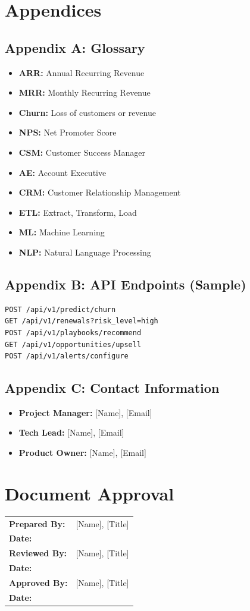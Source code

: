 \documentclass[12pt,a4paper]{article}
\begin{document}
\section{Appendices}

\subsection{Appendix A: Glossary}
\begin{itemize}
    \item \textbf{ARR:} Annual Recurring Revenue
    \item \textbf{MRR:} Monthly Recurring Revenue
    \item \textbf{Churn:} Loss of customers or revenue
    \item \textbf{NPS:} Net Promoter Score
    \item \textbf{CSM:} Customer Success Manager
    \item \textbf{AE:} Account Executive
    \item \textbf{CRM:} Customer Relationship Management
    \item \textbf{ETL:} Extract, Transform, Load
    \item \textbf{ML:} Machine Learning
    \item \textbf{NLP:} Natural Language Processing
\end{itemize}

\subsection{Appendix B: API Endpoints (Sample)}
\begin{verbatim}
POST /api/v1/predict/churn
GET /api/v1/renewals?risk_level=high
POST /api/v1/playbooks/recommend
GET /api/v1/opportunities/upsell
POST /api/v1/alerts/configure
\end{verbatim}

\subsection{Appendix C: Contact Information}
\begin{itemize}
    \item \textbf{Project Manager:} [Name], [Email]
    \item \textbf{Tech Lead:} [Name], [Email]
    \item \textbf{Product Owner:} [Name], [Email]
\end{itemize}

\section{Document Approval}
\begin{tabularx}{\textwidth}{|X|X|}
\hline
\textbf{Prepared By:} & [Name], [Title] \\
\textbf{Date:} & \\
\hline
\textbf{Reviewed By:} & [Name], [Title] \\
\textbf{Date:} & \\
\hline
\textbf{Approved By:} & [Name], [Title] \\
\textbf{Date:} & \\
\hline
\end{tabularx}
\end{document}
